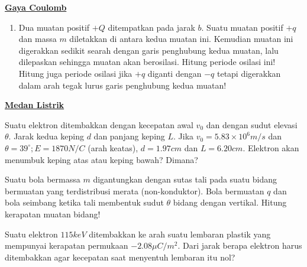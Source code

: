 \noindent \underline{\textbf{Gaya Coulomb}}
\vskip 10pt


\begin{enumerate}
    \item Dua muatan positif $+Q$ ditempatkan pada jarak $b$. Suatu muatan positif $+q$ dan massa $m$ diletakkan di antara kedua muatan ini. Kemudian muatan ini digerakkan sedikit searah dengan garis penghubung kedua muatan, lalu dilepaskan sehingga muatan akan berosilasi. Hitung periode osilasi ini! Hitung juga periode osilasi jika $+q$ diganti dengan $-q$ tetapi digerakkan dalam arah tegak lurus garis penghubung kedua muatan!
\end{enumerate}
\noindent \underline{\textbf{Medan Listrik}}
\vskip 10pt
\begin{enumerate}
    \item Suatu elektron ditembakkan dengan kecepatan awal $v_0$ dan dengan sudut elevasi $\theta$. Jarak kedua keping $d$ dan panjang keping $L$. Jika $v_0 = 5.83\times 10^6 m/s$ dan $\theta = 39^{\circ} ; E= 1870N/C$ (arah keatas), $d=1.97cm$ dan $L=6.20 cm$. Elektron akan menumbuk keping atas atau keping bawah? Dimana?
    
    \begin{center}
    \end{center}

    \begin{minipage}{0.6\textwidth}
    \item Suatu bola bermassa $m$ digantungkan dengan sutas tali pada suatu bidang bermuatan yang terdistribusi merata (non-konduktor). Bola bermuatan $q$ dan bola seimbang ketika tali membentuk sudut $\theta$ bidang dengan vertikal. Hitung kerapatan muatan bidang!
    \end{minipage}
    \hfill
    \begin{minipage}{0.25\textwidth}
    \end{minipage}

    \item Suatu elektron $115keV$ ditembakkan ke arah suatu lembaran plastik yang mempunyai kerapatan permukaan $-2.08\mu C/m^{2}$. Dari jarak berapa elektron harus ditembakkan agar kecepatan saat menyentuh lembaran itu nol?
\end{enumerate}